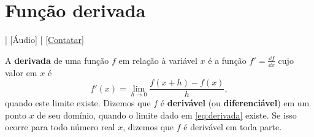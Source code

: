 \section{Função derivada}\label{cap_deriv_sec_funder}

\begin{flushright}
  [Vídeo] | [Áudio] | \href{https://phkonzen.github.io/notas/contato.html}{[Contatar]}
\end{flushright}

A {\bf derivada} de uma função $f$ em relação à variável $x$ é a função $\displaystyle f' = \frac{\dd f}{\dd x}$ cujo valor em $x$ é
\begin{equation}\label{eq:derivada}
  f'(x) = \lim_{h\to 0} \frac{f(x+h)-f(x)}{h},
\end{equation}
quando este limite existe. Dizemos que $f$ é {\bf derivável} (ou {\bf diferenciável}) em um ponto $x$ de seu domínio, quando o limite dado em \eqref{eq:derivada} existe. Se isso ocorre para todo número real $x$, dizemos que $f$ é derivável em toda parte.

